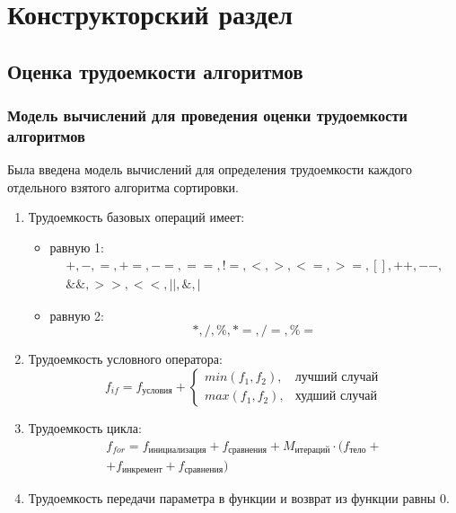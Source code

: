 \chapter{Конструкторский раздел}

\section{Оценка трудоемкости алгоритмов}

\subsection{Модель вычислений для проведения оценки трудоемкости алгоритмов}

Была введена модель вычислений для определения трудоемкости каждого отдельного взятого алгоритма сортировки.

\begin{enumerate}[label={\arabic*)}]
	\item Трудоемкость базовых операций имеет:
	\begin{itemize}[label=---]
		\item равную 1:
		\begin{equation}
			\label{for:operations_1}
			\begin{gathered}
				+, -, =, +=, -=, ==, !=, <, >, <=, >=, [], ++, {-}-,\\
				\&\&, >>, <<, ||, \&, |
			\end{gathered}
		\end{equation}
		\item равную 2:
		\begin{equation}
			\label{for:operations_2}
			*, /, \%, *=, /=, \%=
		\end{equation}
	\end{itemize}
	\item Трудоемкость условного оператора:
	\begin{equation}
		\label{for:if}
		f_{if} = f_{\text{условия}} + 
		\begin{cases}
			min(f_1, f_2), & \text{лучший случай}\\
			max(f_1, f_2), & \text{худший случай}
		\end{cases}
	\end{equation}
	\item Трудоемкость цикла:
	\begin{equation}
		\label{for:for}
		\begin{gathered}
			f_{for} = f_{\text{инициализация}} + f_{\text{сравнения}} + M_{\text{итераций}} \cdot (f_{\text{тело}} +\\
			+ f_{\text{инкремент}} + f_{\text{сравнения}})
		\end{gathered}
	\end{equation}
	\item Трудоемкость передачи параметра в функции и возврат из функции равны 0.
\end{enumerate}

